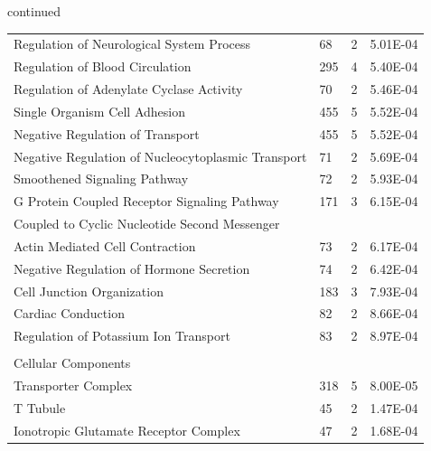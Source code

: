 \begin{refsection}
\begin{table}[H]
\small
{}\selectfont
\label{table3S12v1}
\centering
continued \\
\vspace{1em}
\begin{tabular}{@{}llll@{}}
\hline
Regulation of Neurological System Process           & 68  & 2 & 5.01E-04         \\
Regulation of Blood Circulation                     & 295 & 4 & 5.40E-04         \\
Regulation of Adenylate Cyclase Activity            & 70  & 2 & 5.46E-04         \\
Single Organism Cell Adhesion                       & 455 & 5 & 5.52E-04         \\
Negative Regulation of Transport                    & 455 & 5 & 5.52E-04         \\
Negative Regulation of Nucleocytoplasmic Transport  & 71  & 2 & 5.69E-04         \\
Smoothened Signaling Pathway                        & 72  & 2 & 5.93E-04         \\
G Protein Coupled Receptor Signaling Pathway        & 171 & 3 & 6.15E-04         \\
Coupled to Cyclic Nucleotide Second Messenger       &     &   &                  \\
Actin Mediated Cell Contraction                     & 73  & 2 & 6.17E-04         \\
Negative Regulation of Hormone Secretion            & 74  & 2 & 6.42E-04         \\
Cell Junction Organization                          & 183 & 3 & 7.93E-04         \\
Cardiac Conduction                                  & 82  & 2 & 8.66E-04         \\
Regulation of Potassium Ion Transport               & 83  & 2 & 8.97E-04         \\
                                                    &   &   &   
        \\
Cellular Components                                 &     &   &                  \\
Transporter Complex                                 & 318 & 5 & 8.00E-05         \\
T Tubule                                            & 45  & 2 & 1.47E-04         \\
Ionotropic Glutamate Receptor Complex               & 47  & 2 & 1.68E-04         \\

\end{tabular}
\end{table}
\end{refsection}
